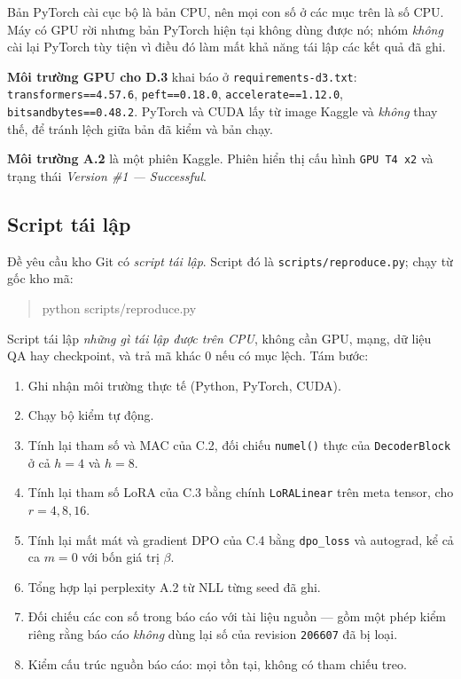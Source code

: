 Bản PyTorch cài cục bộ là bản CPU, nên mọi con số ở các mục trên là số CPU. Máy có
GPU rời nhưng bản PyTorch hiện tại không dùng được nó; nhóm \emph{không} cài lại
PyTorch tùy tiện vì điều đó làm mất khả năng tái lập các kết quả đã ghi.

\textbf{Môi trường GPU cho D.3} khai báo ở \texttt{requirements-d3.txt}:
\texttt{transformers==4.57.6}, \texttt{peft==0.18.0},
\texttt{accelerate==1.12.0}, \texttt{bitsandbytes==0.48.2}. PyTorch và CUDA lấy từ
image Kaggle và \emph{không} thay thế, để tránh lệch giữa bản đã kiểm và bản chạy.

\textbf{Môi trường A.2} là một phiên Kaggle. Phiên hiển thị cấu hình
\texttt{GPU T4 x2} và trạng thái \emph{Version \#1 --- Successful}.

\subsection{Script tái lập \dalam}

Đề yêu cầu kho Git có \emph{script tái lập}. Script đó là
\texttt{scripts/reproduce.py}; chạy từ gốc kho mã:

\begin{quote}\small\ttfamily
python scripts/reproduce.py
\end{quote}

Script tái lập \emph{những gì tái lập được trên CPU}, không cần GPU, mạng, dữ liệu
QA hay checkpoint, và trả mã khác $0$ nếu có mục lệch. Tám bước:

\begin{enumerate}[leftmargin=2em]
\item Ghi nhận môi trường thực tế (Python, PyTorch, CUDA).
\item Chạy bộ kiểm tự động.
\item Tính lại tham số và MAC của C.2, đối chiếu \texttt{numel()} thực của
\texttt{DecoderBlock} ở cả $h=4$ và $h=8$.
\item Tính lại tham số LoRA của C.3 bằng chính \texttt{LoRALinear} trên meta
tensor, cho $r=4,8,16$.
\item Tính lại mất mát và gradient DPO của C.4 bằng \texttt{dpo\_loss} và
autograd, kể cả ca $m=0$ với bốn giá trị $\beta$.
\item Tổng hợp lại perplexity A.2 từ NLL từng seed đã ghi.
\item Đối chiếu các con số trong báo cáo với tài liệu nguồn --- gồm một phép
kiểm riêng rằng báo cáo \emph{không} dùng lại số của revision \texttt{206607}
đã bị loại.
\item Kiểm cấu trúc nguồn báo cáo: mọi \verb|| tồn tại, không có tham
chiếu treo.
\end{enumerate}

